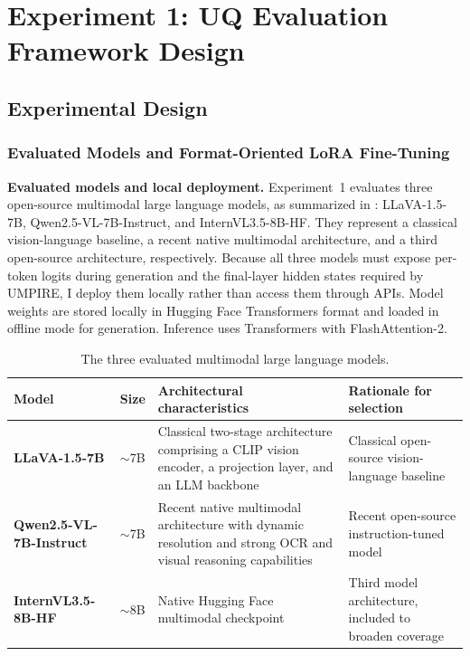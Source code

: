 \clearpage
\section{Experiment 1: UQ Evaluation Framework Design}
\label{sec:experiment1_framework}

\subsection{Experimental Design}
\label{subsec:experimental_design}

\subsubsection{Evaluated Models and Format-Oriented LoRA Fine-Tuning}
\label{subsubsec:models_lora}

\textbf{Evaluated models and local deployment.} Experiment~1 evaluates three open-source multimodal large language models, as summarized in : LLaVA-1.5-7B, Qwen2.5-VL-7B-Instruct, and InternVL3.5-8B-HF. They represent a classical vision-language baseline, a recent native multimodal architecture, and a third open-source architecture, respectively. Because all three models must expose per-token logits during generation and the final-layer hidden states required by UMPIRE, I deploy them locally rather than access them through APIs. Model weights are stored locally in Hugging Face Transformers format and loaded in offline mode for generation. Inference uses Transformers with FlashAttention-2.

\begin{table}[H]
\centering
\caption{The three evaluated multimodal large language models.}
\label{tab:evaluated_models}
\small
\setlength{\tabcolsep}{3.5pt}
\renewcommand{\arraystretch}{1.2}
\begin{tabularx}{\linewidth}{@{}L{3.6cm}C{0.85cm}Y Y@{}}
\toprule
\textbf{Model} & \textbf{Size} & \textbf{Architectural characteristics} & \textbf{Rationale for selection} \\
\midrule
\textbf{LLaVA-1.5-7B} & $\sim$7B & Classical two-stage architecture comprising a CLIP vision encoder, a projection layer, and an LLM backbone & Classical open-source vision-language baseline \\
\addlinespace[3pt]
\textbf{Qwen2.5-VL-7B-Instruct} & $\sim$7B & Recent native multimodal architecture with dynamic resolution and strong OCR and visual reasoning capabilities & Recent open-source instruction-tuned model \\
\addlinespace[3pt]
\textbf{InternVL3.5-8B-HF} & $\sim$8B & Native Hugging Face multimodal checkpoint & Third model architecture, included to broaden coverage \\
\bottomrule
\end{tabularx}
\end{table}

